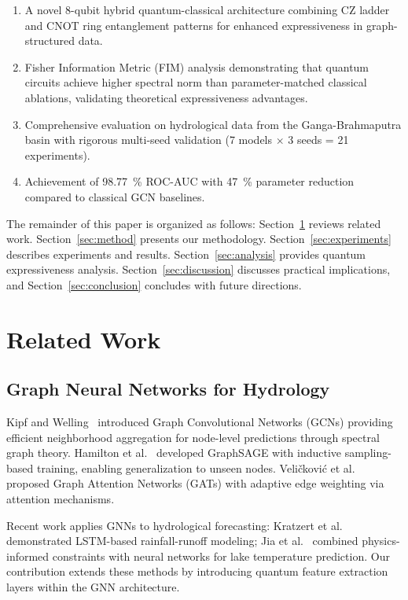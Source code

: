 \documentclass[conference]{IEEEtran}
\begin{document}
\begin{enumerate}
\item A novel 8-qubit hybrid quantum-classical architecture combining CZ ladder and CNOT ring entanglement patterns for enhanced expressiveness in graph-structured data.
\item Fisher Information Metric (FIM) analysis demonstrating that quantum circuits achieve higher spectral norm than parameter-matched classical ablations, validating theoretical expressiveness advantages.
\item Comprehensive evaluation on hydrological data from the Ganga-Brahmaputra basin with rigorous multi-seed validation (7 models $\times$ 3 seeds = 21 experiments).
\item Achievement of \SI{98.77}{\percent} ROC-AUC with \SI{47}{\percent} parameter reduction compared to classical GCN baselines.
\end{enumerate}

The remainder of this paper is organized as follows: Section~\ref{sec:related} reviews related work. Section~\ref{sec:method} presents our methodology. Section~\ref{sec:experiments} describes experiments and results. Section~\ref{sec:analysis} provides quantum expressiveness analysis. Section~\ref{sec:discussion} discusses practical implications, and Section~\ref{sec:conclusion} concludes with future directions.

\section{Related Work}
\label{sec:related}

\subsection{Graph Neural Networks for Hydrology}

Kipf and Welling~\cite{b4} introduced Graph Convolutional Networks (GCNs) providing efficient neighborhood aggregation for node-level predictions through spectral graph theory. Hamilton et al.~\cite{b1} developed GraphSAGE with inductive sampling-based training, enabling generalization to unseen nodes. Veli\v{c}kovi\'{c} et al.~\cite{b2} proposed Graph Attention Networks (GATs) with adaptive edge weighting via attention mechanisms.

Recent work applies GNNs to hydrological forecasting: Kratzert et al.~\cite{b9} demonstrated LSTM-based rainfall-runoff modeling; Jia et al.~\cite{b10} combined physics-informed constraints with neural networks for lake temperature prediction. Our contribution extends these methods by introducing quantum feature extraction layers within the GNN architecture.
\end{document}
